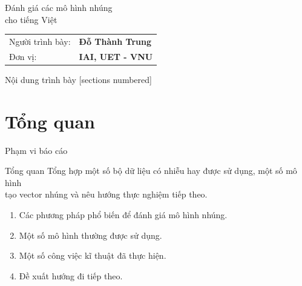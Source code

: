 \documentclass[aspectratio=169,10pt]{beamer}
\title{\DeckTitle}
\author{\AuthorName}
\institute{\UniversityName}
\date{\today}
\newcommand{\AuthorName}{Đỗ Thành Trung}
\newcommand{\UniversityName}{IAI, UET - VNU}
\newcommand{\DeckTitle}{Đánh giá các mô hình nhúng \\ cho tiếng Việt}
\begin{document}
\begin{frame}[plain]
    \vfill
    {\color{white}\DeckTitle\par}
    \vspace{0.35cm}
    {\color{mint}\insertsubtitle\par}
    \vspace{1.1cm}
    \begin{tabular}{@{}ll@{}}
        Người trình bày: & \textbf{\AuthorName}     \\
        Đơn vị:          & \textbf{\UniversityName}
    \end{tabular}
    \vfill
    \color{mint}\small\insertdate
\end{frame}

\begin{frame}{Nội dung trình bày}
    [sections numbered]
    \tableofcontents
\end{frame}

\section{Tổng quan}
\begin{frame}{Phạm vi báo cáo}
    \begin{block}{Tổng quan}
        Tổng hợp một số bộ dữ liệu có nhiễu hay được sử dụng, một số mô hình \\ tạo vector nhúng và nêu hướng thực nghiệm tiếp theo.
    \end{block}
    \begin{enumerate}
        \item Các phương pháp phổ biến để đánh giá mô hình nhúng.
        \item Một số mô hình thường được sử dụng.
        \item Một số công việc kĩ thuật đã thực hiện.
        \item Đề xuất hướng đi tiếp theo.
    \end{enumerate}
\end{frame}
\end{document}
